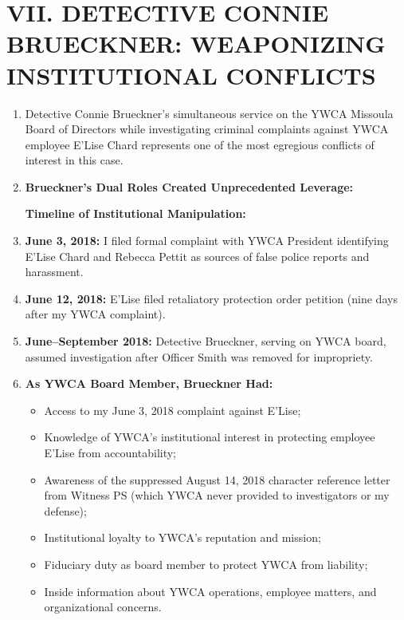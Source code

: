 \documentclass[12pt,letterpaper]{article}
\begin{document}
\section*{VII. DETECTIVE CONNIE BRUECKNER: WEAPONIZING INSTITUTIONAL CONFLICTS}

\begin{enumerate}

\item Detective Connie Brueckner's simultaneous service on the YWCA Missoula Board of Directors while investigating criminal complaints against YWCA employee E'Lise Chard represents one of the most egregious conflicts of interest in this case.

\item \textbf{Brueckner's Dual Roles Created Unprecedented Leverage:}

\textbf{Timeline of Institutional Manipulation:}

\item \textbf{June 3, 2018:} I filed formal complaint with YWCA President identifying E'Lise Chard and Rebecca Pettit as sources of false police reports and harassment.

\item \textbf{June 12, 2018:} E'Lise filed retaliatory protection order petition (nine days after my YWCA complaint).

\item \textbf{June--September 2018:} Detective Brueckner, serving on YWCA board, assumed investigation after Officer Smith was removed for impropriety.

\item \textbf{As YWCA Board Member, Brueckner Had:}

\begin{itemize}
\item Access to my June 3, 2018 complaint against E'Lise;
\item Knowledge of YWCA's institutional interest in protecting employee E'Lise from accountability;
\item Awareness of the suppressed August 14, 2018 character reference letter from Witness PS (which YWCA never provided to investigators or my defense);
\item Institutional loyalty to YWCA's reputation and mission;
\item Fiduciary duty as board member to protect YWCA from liability;
\item Inside information about YWCA operations, employee matters, and organizational concerns.
\end{itemize}


\end{enumerate}
\end{document}
